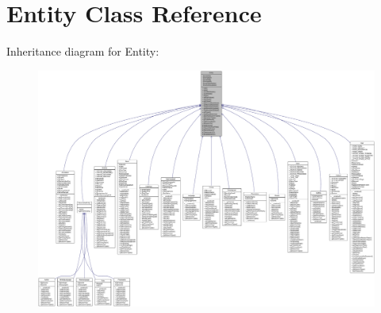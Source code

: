 \hypertarget{classEntity}{
\section{Entity Class Reference}
\label{classEntity}
}


Inheritance diagram for Entity:\nopagebreak
\begin{figure}[H]
\begin{center}
\leavevmode
\includegraphics[width=400pt]{classEntity__inherit__graph}
\end{center}
\end{figure}
